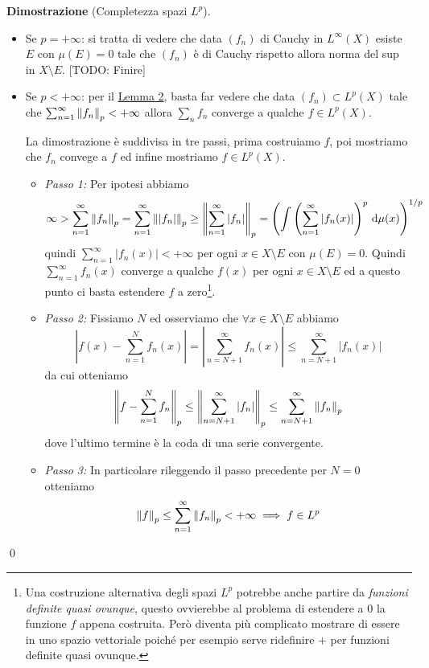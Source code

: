 \documentclass[a4paper, 12pt]{report}
\begin{document}
\textbf{Dimostrazione} (Completezza spazi $L^p$).
\begin{itemize}
	\item 
		Se $p = +\infty$: si tratta di vedere che data $(f_n)$ di Cauchy in $L^\infty(X)$ esiste $E$ con $\mu(E) = 0$ tale che $(f_n)$ è di Cauchy rispetto allora norma del sup in $X \setminus E$. [TODO: Finire]

	\item 
		Se $p < +\infty$: per il \hyperlink{prop:completeness_lemma_2}{Lemma 2}, basta far vedere che data $(f_n) \subset L^p(X)$ tale che $\sum_{n=1}^\infty \left\lVert f_n \right\rVert_p < +\infty$ allora $\sum_n f_n$ converge a qualche $f \in L^p(X)$.

		La dimostrazione è suddivisa in tre passi, prima costruiamo $f$, poi mostriamo che $f_n$ convege a $f$ ed infine mostriamo $f \in L^p(X)$.

		\begin{itemize}
			\item 
				\textit{Passo 1:} 
				Per ipotesi abbiamo
				$$
				\infty 
				> \sum_{n=1}^\infty \left\lVert f_n \right\rVert_p 
				= \sum_{n=1}^\infty \left\lVert |f_n| \right\rVert_p 
				\geq \left\lVert \sum_{n=1}^\infty |f_n| \right\rVert_p 
				= \left( \int \left( \sum_{n=1}^\infty |f_n(x)| \right)^p \,\mathrm{d} \mu(x) \right)^{1/p}
				$$
				quindi $\sum_{n=1}^\infty |f_n(x)| < +\infty$ per ogni $x \in X \setminus E$ con $\mu(E) = 0$. Quindi $\sum_{n=1}^\infty f_n(x)$ converge a qualche $f(x)$ per ogni $x \in X \setminus E$ ed a questo punto ci basta estendere $f$ a zero\footnote{Una costruzione alternativa degli spazi $L^p$ potrebbe anche partire da \textit{funzioni definite quasi ovunque}, questo ovvierebbe al problema di estendere a $0$ la funzione $f$ appena costruita. Però diventa più complicato mostrare di essere in uno spazio vettoriale poiché per esempio serve ridefinire $+$ per funzioni definite quasi ovunque.}.
			
			\item 
				\textit{Passo 2:}
				Fissiamo $N$ ed osserviamo che $\forall x \in X \setminus E$ abbiamo
				$$
				\left| f(x) - \sum_{n=1}^N f_n(x) \right| 
				= \left| \sum_{n=N+1}^\infty f_n(x) \right| 
				\leq \sum_{n=N+1}^\infty |f_n(x)|
				$$
				da cui otteniamo
				$$
				\left\lVert f - \sum_{n=1}^N f_n \right\rVert_p 
				\leq \left\lVert \sum_{n=N+1}^\infty |f_n| \right\rVert_p
				\leq \sum_{n=N+1}^\infty \left\lVert f_n \right\rVert_p
				$$
				dove l'ultimo termine è la coda di una serie convergente.
			
			\item 
				\textit{Passo 3:}
				In particolare rileggendo il passo precedente per $N = 0$ otteniamo
				$$
				\left\lVert f \right\rVert_p \leq \sum_{n=1}^\infty \left\lVert f_n \right\rVert_p < +\infty \implies f \in L^p
				$$

		\end{itemize}
\end{itemize}
\qed
\end{document}
